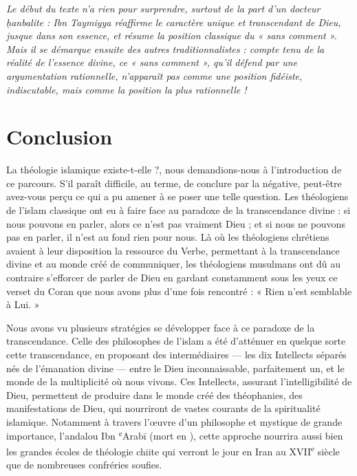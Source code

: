 \emph{Le début du texte n'a rien pour surprendre, surtout de la part
d'un docteur ḥanbalite : Ibn Taymiyya réaffirme le caractère unique et
transcendant de Dieu, jusque dans son essence, et résume la position
classique du « sans comment ». Mais il se démarque ensuite des autres
traditionnalistes : compte tenu de la réalité de l'essence divine, ce «
sans comment », qu'il défend par une argumentation rationnelle,
n'apparaît pas comme une position fidéiste, indiscutable, mais comme la
position la plus rationnelle !}


 \section{Conclusion}

La théologie islamique existe-t-elle ?, nous demandions-nous à
l'introduction de ce parcours. S'il paraît difficile, au terme, de
conclure par la négative, peut-être avez-vous perçu ce qui a pu amener à
se poser une telle question. Les théologiens de l'islam classique ont eu
à faire face au paradoxe de la transcendance divine : si nous pouvons en
parler, alors ce n'est pas vraiment Dieu ; et si nous ne pouvons pas en
parler, il n'est au fond rien pour nous. Là où les théologiens chrétiens
avaient à leur disposition la ressource du Verbe, permettant à la
transcendance divine et au monde créé de communiquer, les théologiens
musulmans ont dû au contraire s'efforcer de parler de Dieu en gardant
constamment sous les yeux ce verset du Coran que nous avons plus d'une
fois rencontré : « Rien n'est semblable à Lui. »

Nous avons vu plusieurs stratégies se développer face à ce paradoxe de
la transcendance. Celle des philosophes de l'islam a été d'atténuer en
quelque sorte cette transcendance, en proposant des intermédiaires ---
les dix Intellects séparés nés de l'émanation divine --- entre le Dieu
inconnaissable, parfaitement un, et le monde de la multiplicité où nous
vivons. Ces Intellects, assurant l'intelligibilité de Dieu, permettent
de produire dans le monde créé des théophanies, des manifestations de
Dieu, qui nourriront de vastes courants de la spiritualité islamique.
Notamment à travers l'œuvre d'un philosophe et mystique de grande
importance, l'andalou Ibn ʿArabī (mort en ), cette approche nourrira
aussi bien les grandes écoles de théologie chiite qui verront le jour en
Iran au XVII\textsuperscript{e} siècle que de nombreuses confréries
soufies.

